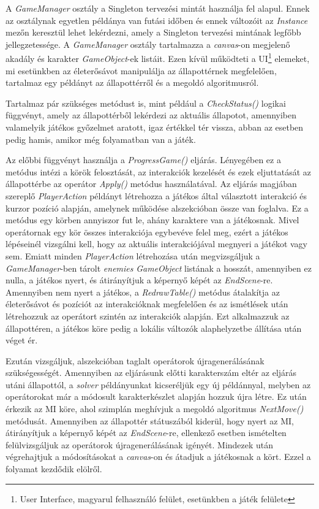 \documentclass[
]{thesis-ekf}
\theoremstyle{definition}
\theoremstyle{remark}
\begin{document}
A \emph{GameManager} osztály a Singleton tervezési mintát használja fel alapul. Ennek az osztálynak egyetlen példánya van futási időben és ennek változóit az \emph{Instance} mezőn keresztül lehet lekérdezni, amely a Singleton tervezési mintának legfőbb jellegzetessége. A \emph{GameManager} osztály tartalmazza a \emph{canvas}-on megjelenő akadály és karakter \emph{GameObject}-ek listáit. Ezen kívül működteti a UI\footnote{User Interface, magyarul felhasználó felület, esetünkben a játék felülete} elemeket, mi esetünkben az életerősávot manipulálja az állapottérnek megfelelően, tartalmaz egy példányt az állapottérről és a megoldó algoritmusról.

Tartalmaz pár szükséges metódust is, mint például a \emph{CheckStatus()} logikai függvényt, amely az állapottérből lekérdezi az aktuális állapotot, amennyiben valamelyik játékos győzelmet aratott, igaz értékkel tér vissza, abban az esetben pedig hamis, amikor még folyamatban van a játék. 

Az előbbi függvényt használja a \emph{ProgressGame()} eljárás. Lényegében ez a metódus intézi a körök felosztását, az interakciók kezelését és ezek eljuttatását az állapottérbe az operátor \emph{Apply()} metódus használatával. Az eljárás magjában szereplő \emph{PlayerAction} példányt létrehozza a játékos által választott interakció és kurzor pozíció alapján, amelynek működése  alszekcióban össze van foglalva. Ez a metódus egy körben annyiszor fut le, ahány karaktere van a játékosnak. Mivel operátornak egy kör összes interakciója egybevéve felel meg, ezért a játékos lépéseinél vizsgálni kell, hogy az aktuális interakciójával megnyeri a játékot vagy sem. Emiatt minden \emph{PlayerAction} létrehozása után megvizsgáljuk a \emph{GameManager}-ben tárolt \emph{enemies} \emph{GameObject} listának a hosszát, amennyiben ez nulla, a játékos nyert, és átirányítjuk a képernyő képét az \emph{EndScene}-re. Amennyiben nem nyert a játékos, a \emph{RedrawTable()} metódus átalakítja az életerősávot és pozíciót az interakcióknak megfelelően és az ismétlések után létrehozzuk az operátort szintén az interakciók alapján. Ezt alkalmazzuk az állapottéren, a játékos köre pedig a lokális változók alaphelyzetbe állítása után véget ér. 

Ezután vizsgáljuk,  alszekcióban taglalt operátorok újragenerálásának szükségességét. Amennyiben az eljárásunk előtti karakterszám eltér az eljárás utáni állapottól, a \emph{solver} példányunkat kicseréljük egy új példánnyal, melyben az operátorokat már a módosult karakterkészlet alapján hozzuk újra létre. Ez után érkezik az MI köre, ahol szimplán meghívjuk a megoldó algoritmus \emph{NextMove()} metódusát. Amennyiben az állapottér státuszából kiderül, hogy nyert az MI, átirányítjuk a képernyő képét az \emph{EndScene}-re, ellenkező esetben ismételten felülvizsgáljuk az operátorok újragenerálásának igényét. Mindezek után végrehajtjuk a módosításokat a \emph{canvas}-on és átadjuk a játékosnak a kört. Ezzel a folyamat kezdődik elölről.
\end{document}
